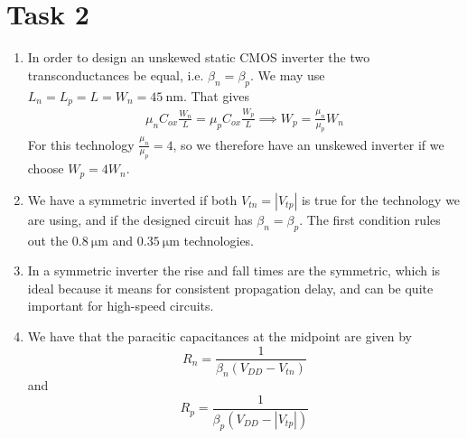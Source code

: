 \documentclass[a4paper,11pt,norsk]{article}
\begin{document}
\section*{Task 2}
\begin{enumerate}
    \item In order to design an unskewed static CMOS inverter the two transconductances be equal, i.e. 
        $\beta_n = \beta_p$. We may use $L_n = L_p = L = W_n = \SI{45}{\nano\meter}$. 
        That gives 
        \begin{align*}
            \mu_n C_{ox} \frac{W_n}{L} = \mu_p C_{ox} \frac{W_p}{L} \implies W_p = \frac{\mu_n}{\mu_p} W_n
        \end{align*}
        For this technology $\frac{\mu_n}{\mu_p} = 4$, so we therefore have an unskewed inverter if 
        we choose $W_p = 4 W_n$.
    \item We have a symmetric inverted if both $V_{tn} = |V_{tp}|$ is true for the technology we are using, 
        and if the designed circuit has $\beta_n = \beta_p$. The first condition rules out the $\SI{0.8}{\micro\meter}$ 
        and $\SI{0.35}{\micro\meter}$ technologies.
    \item In a symmetric inverter the rise and fall times are the symmetric, which is ideal because it means 
        for consistent propagation delay, and can be quite important for high-speed circuits.
    \item We have that the paracitic capacitances at the midpoint are given by
        \[
            R_n = \frac{1}{\beta_n (V_{DD} - V_{tn})}
        \]
        and 
        \[
            R_p = \frac{1}{\beta_p (V_{DD} - |V_{tp}|)}
        \]


\end{enumerate}
\end{document}
